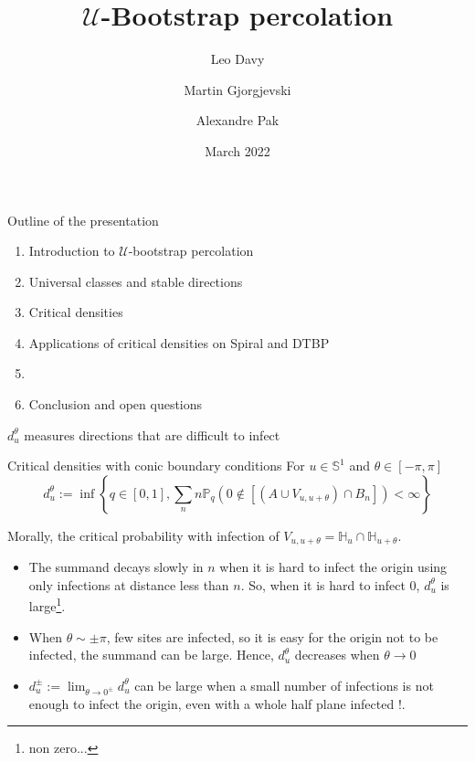 \documentclass{beamer}
\title[title] %
{$\mathcal{U}$-Bootstrap percolation}
\author[Davy, Gjorgjevski, Pak] %
{Leo Davy \and Martin Gjorgjevski \and Alexandre Pak}
\institute[ENS Lyon] %
{
  ENS Lyon \\
  M2 Advanced Mathematics}
\date[Short Occasion] %
{March 2022}
\begin{document}
\maketitle

\begin{frame}{Outline of the presentation}
	\begin{enumerate}
		\item Introduction to $\mathcal{U}$-bootstrap percolation
		\item Universal classes and stable directions
		\item Critical densities
		\item Applications of critical densities on Spiral and DTBP
		\item
		\item Conclusion and open questions
	\end{enumerate}
\end{frame}

\begin{frame}{$d_u^\theta$ measures directions that are difficult to infect}
	\begin{block}{Critical densities with conic boundary conditions}
		For $u\in \mathbb{S}^1$ and $\theta\in[-\pi, \pi]$
		$$d_u^\theta := \inf\left\{q\in[0,1], \sum_n n\mathbb{P}_q(0\not\in [(A\cup V_{u,u+\theta})\cap B_n]) < \infty\right\}$$
	\end{block}
	Morally, the critical probability with infection of $V_{u,u+\theta} = \mathbb{H}_u \cap \mathbb{H}_{u+\theta}$. 
	\begin{itemize}
		\item The summand decays slowly in $n$ when it is hard to infect the origin using only infections at distance less than $n$. So, when it is hard to infect 0,  $d_u^\theta$ is large\footnote{non zero...}.
		\item When $\theta \sim \pm \pi$, few sites are infected, so it is easy for the origin not to be infected, the summand can be large. Hence, $d_u^\theta$ decreases when $\theta\to 0$
		\item $d_u^\pm := \lim_{\theta \to 0^\pm} d_u^\theta$ can be large when a small number of infections is not enough to infect the origin, even with a whole half plane infected !. 
	\end{itemize}
\end{frame}
\end{document}
